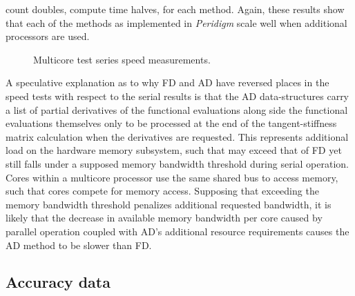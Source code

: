 \documentclass[preprint,12pt]{elsarticle}
\begin{document}
count doubles, compute time halves, for each method. Again, these results show
that each of the methods as implemented in \emph{Peridigm} scale well when
additional processors are used. 
%
\begin{figure}[tbp] \centering \scalebox{1.0}{}
\caption{Multicore test series speed measurements.} \label{fig:multi_speed}
\end{figure}
%
A speculative explanation as to why FD and AD have reversed places in the speed
tests with respect to the serial results is that the AD data-structures carry a
list of partial derivatives of the functional evaluations along side the
functional evaluations themselves only to be processed at the end of the
tangent-stiffness matrix calculation when the derivatives are requested. This
represents additional load on the hardware memory subsystem, such that may
exceed that of FD yet still falls under a supposed memory bandwidth threshold
during serial operation. Cores within a multicore processor use the same shared
bus to access memory, such that cores compete for memory access. Supposing that
exceeding the memory bandwidth threshold penalizes additional requested
bandwidth, it is likely that the decrease in available memory bandwidth per
core caused by parallel operation coupled with AD's additional resource
requirements causes the AD method to be slower than FD. 

\subsection{Accuracy data}
\end{document}
